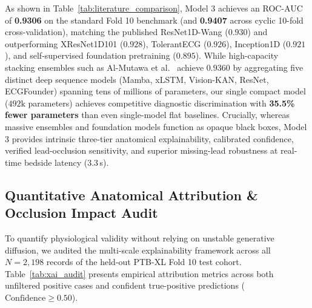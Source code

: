 \documentclass[5p,twocolumn,10pt]{elsarticle}
\begin{document}
As shown in Table~\ref{tab:literature_comparison}, Model 3 achieves an ROC-AUC of \textbf{0.9306} on the standard Fold 10 benchmark (and \textbf{0.9407} across cyclic 10-fold cross-validation), matching the published ResNet1D-Wang ($0.930$) and outperforming XResNet1D101 ($0.928$), TolerantECG ($0.926$), Inception1D ($0.921$), and self-supervised foundation pretraining ($0.895$). While high-capacity stacking ensembles such as Al-Mutawa et al.~\cite{al2026stacking} achieve $0.9360$ by aggregating five distinct deep sequence models (Mamba, xLSTM, Vision-KAN, ResNet, ECGFounder) spanning tens of millions of parameters, our single compact model ($492\text{k}$ parameters) achieves competitive diagnostic discrimination with \textbf{35.5\% fewer parameters} than even single-model flat baselines. Crucially, whereas massive ensembles and foundation models function as opaque black boxes, Model 3 provides intrinsic three-tier anatomical explainability, calibrated confidence, verified lead-occlusion sensitivity, and superior missing-lead robustness at real-time bedside latency ($3.3$\,s).

\subsection{Quantitative Anatomical Attribution \& Occlusion Impact Audit}
\label{sec:attribution_audit}
To quantify physiological validity without relying on unstable generative diffusion, we audited the multi-scale explainability framework across all $N = 2,198$ records of the held-out PTB-XL Fold 10 test cohort. Table~\ref{tab:xai_audit} presents empirical attribution metrics across both unfiltered positive cases and confident true-positive predictions ($\text{Confidence} \ge 0.50$).
\end{document}
